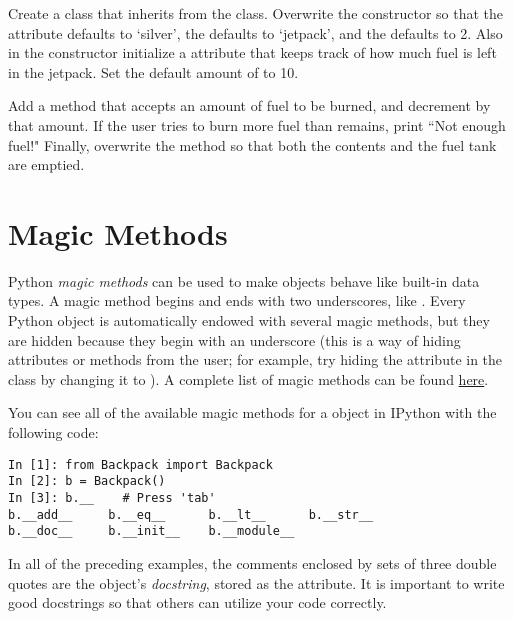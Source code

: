 \begin{problem}
Create a  class that inherits from the  class.
Overwrite the constructor so that the  attribute defaults to `silver', the  defaults to `jetpack', and the  defaults to 2.
Also in the constructor initialize a  attribute that keeps track of how much fuel is left in the jetpack.
Set the default amount of  to 10.

Add a  method that accepts an amount of fuel to be burned, and decrement  by that amount.
If the user tries to burn more fuel than remains, print ``Not enough fuel!"
Finally, overwrite the  method so that both the contents and the fuel tank are emptied.
\end{problem}

\section*{Magic Methods}

Python \emph{magic methods} can be used to make objects behave like built-in data types.
A magic method begins and ends with two underscores, like .
Every Python object is automatically endowed with several magic methods, but they are hidden because they begin with an underscore (this is a way of hiding attributes or methods from the user; for example, try hiding the  attribute in the  class by changing it to ).
A complete list of magic methods can be found \href{https://docs.python.org/2/reference/datamodel.html#special-method-names}{here}.

You can see all of the available magic methods for a  object in IPython with the following code:

\begin{lstlisting}
In [1]: from Backpack import Backpack
In [2]: b = Backpack()
In [3]: b.__	# Press 'tab'
b.__add__     b.__eq__      b.__lt__      b.__str__     
b.__doc__     b.__init__    b.__module__  
\end{lstlisting}

\begin{info}
In all of the preceding examples, the comments enclosed by sets of three double quotes are the object's \emph{docstring}, stored as the  attribute.
It is important to write good docstrings so that others can utilize your code correctly.
\end{info}

